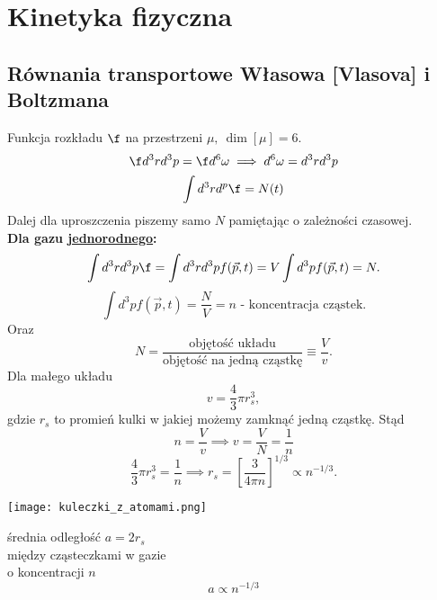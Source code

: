 \section{Kinetyka fizyczna}
\subsection{Równania transportowe Własowa [Vlasova] i Boltzmana}
Funkcja rozkładu $\f$ na przestrzeni $\mu,\ \dim[\mu]=6.$
\begin{equation} \f d^3rd^3p = \f d^6\omega \implies d^6\omega 
= d^3rd^3p \end{equation}
\begin{equation} \int d^3rd^p\f = N(t) \end{equation}
Dalej dla uproszczenia piszemy samo $N$ pamiętając o zależności czasowej.\\

\textbf{Dla gazu \underline{jednorodnego}:}
$$ \int d^3rd^3p \f = \int d^3rd^3pf(\vec{p},t) = V \int d^3p f(\vec{p},t)=N.$$
\begin{equation}
\int d^3p f(\vec{p},t) = \frac{N}{V} = n \mbox{ - koncentracja cząstek.}
\end{equation}
Oraz
\begin{equation}
N = \frac{\mbox{objętość układu}}{\mbox{objętość na jedną cząstkę}} \equiv 
\frac{V}{v}.
\end{equation}
Dla małego układu 
\begin{equation}
v=\frac{4}{3} \pi r_s^3 ,
\end{equation}
gdzie $r_s$ to promień kulki w jakiej możemy zamknąć jedną cząstkę. Stąd
$$ n = \frac{V}{v} \implies v=\frac{V}{N} = \frac{1}{n}$$
$$ \frac{4}{3} \pi r_s^3 = \frac{1}{n} \implies r_s = \left[ \frac{3}{4\pi n}
\right]^{1/3} \propto n^{-1/3}.$$
\begin{center}
\begin{minipage}{0.3\textwidth}
\texttt{[image: kuleczki\_z\_atomami.png]}
\end{minipage}
\begin{minipage}{0.4\textwidth}
średnia odległość $a=2r_s$ \\
między cząsteczkami w gazie \\
o koncentracji $n$ \\
$$a \propto n^{-1/3}$$ \vspace{-5mm}\\
\end{minipage}
\end{center}

